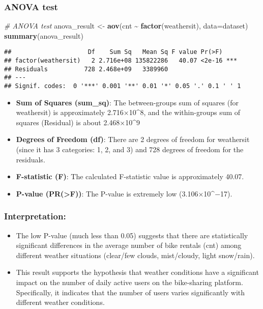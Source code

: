 \documentclass[
]{article}
\newenvironment{Shaded}{\begin{snugshade}}{\end{snugshade}}
\newcommand{\AttributeTok}[1]{\textcolor[rgb]{0.13,0.29,0.53}{#1}}
\newcommand{\CommentTok}[1]{\textcolor[rgb]{0.56,0.35,0.01}{\textit{#1}}}
\newcommand{\FunctionTok}[1]{\textcolor[rgb]{0.13,0.29,0.53}{\textbf{#1}}}
\newcommand{\NormalTok}[1]{#1}
\newcommand{\OtherTok}[1]{\textcolor[rgb]{0.56,0.35,0.01}{#1}}
\newcommand{\SpecialCharTok}[1]{\textcolor[rgb]{0.81,0.36,0.00}{\textbf{#1}}}
\begin{document}
\subsubsection{ANOVA test}\label{anova-test}

\begin{Shaded}
\begin{Highlighting}[]
\CommentTok{\# ANOVA test}
\NormalTok{anova\_result }\OtherTok{\textless{}{-}} \FunctionTok{aov}\NormalTok{(cnt }\SpecialCharTok{\textasciitilde{}} \FunctionTok{factor}\NormalTok{(weathersit), }\AttributeTok{data=}\NormalTok{dataset)}
\FunctionTok{summary}\NormalTok{(anova\_result)}
\end{Highlighting}
\end{Shaded}

\begin{verbatim}
##                     Df    Sum Sq   Mean Sq F value Pr(>F)    
## factor(weathersit)   2 2.716e+08 135822286   40.07 <2e-16 ***
## Residuals          728 2.468e+09   3389960                   
## ---
## Signif. codes:  0 '***' 0.001 '**' 0.01 '*' 0.05 '.' 0.1 ' ' 1
\end{verbatim}

\begin{itemize}
\item
  \textbf{Sum of Squares (sum\_sq)}: The between-groups sum of squares
  (for weathersit) is approximately 2.716×10\^{}8, and the within-groups
  sum of squares (Residual) is about 2.468×10\^{}9
\item
  \textbf{Degrees of Freedom (df)}: There are 2 degrees of freedom for
  weathersit (since it has 3 categories: 1, 2, and 3) and 728 degrees of
  freedom for the residuals.
\item
  \textbf{F-statistic (F)}: The calculated F-statistic value is
  approximately 40.07.
\item
  \textbf{P-value (PR(\textgreater F))}: The P-value is extremely low
  (3.106×10\^{}−17).
\end{itemize}

\subsubsection{\texorpdfstring{\textbf{Interpretation:}}{Interpretation:}}\label{interpretation}

\begin{itemize}
\item
  The low P-value (much less than 0.05) suggests that there are
  statistically significant differences in the average number of bike
  rentals (cnt) among different weather situations (clear/few clouds,
  mist/cloudy, light snow/rain).
\item
  This result supports the hypothesis that weather conditions have a
  significant impact on the number of daily active users on the
  bike-sharing platform. Specifically, it indicates that the number of
  users varies significantly with different weather conditions.
\end{itemize}
\end{document}
